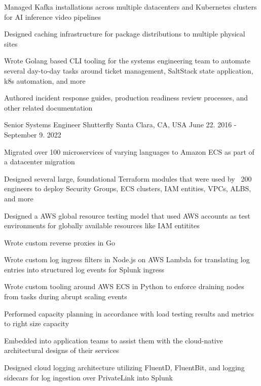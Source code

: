 \begin{cventries}
{\begin{cvitems}
        \item {Managed Kafka installations across multiple datacenters and Kubernetes clusters for AI inference video pipelines}
        \item {Designed caching infrastructure for package distributions to multiple physical sites}
        \item {Wrote Golang based CLI tooling for the systems engineering team to automate several day-to-day tasks around ticket management, SaltStack state application, k8s automation, and more}
        \item {Authored incident response guides, production readiness review processes, and other related documentation}
      \end{cvitems}
    }

  \cventry
    {Senior Systems Engineer} %
    {Shutterfly} %
    {Santa Clara, CA, USA} %
    {June 22. 2016 - September 9. 2022} %
    {
      \begin{cvitems}
        \item {Migrated over 100 microservices of varying languages to Amazon ECS as part of a datacenter migration}
        \item {Designed several large, foundational Terraform modules that were used by ~200 engineers to deploy Security Groups, ECS clusters, IAM entities, VPCs, ALBS, and more}
        \item {Designed a AWS global resource testing model that used AWS accounts as test environments for globally available resources like IAM entitites}
        \item {Wrote custom reverse proxies in Go}
        \item {Wrote custom log ingress filters in Node.js on AWS Lambda for translating log entries into structured log events for Splunk ingress}
        \item {Wrote custom tooling around AWS ECS in Python to enforce draining nodes from tasks during abrupt scaling events}
        \item {Performed capacity planning in accordance with load testing results and metrics to right size capacity}
        \item {Embedded into application teams to assist them with the cloud-native architectural designs of their services}
        \item {Designed cloud logging architecture utilizing FluentD, FluentBit, and logging sidecars for log ingestion over PrivateLink into Splunk}

\end{cvitems}}
\end{cventries}
